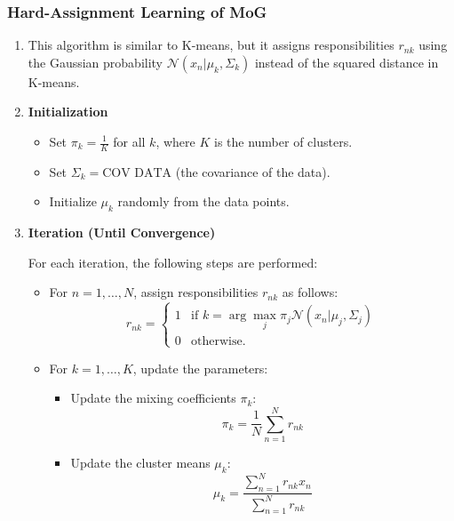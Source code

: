 \subsubsection{Hard-Assignment Learning of MoG}
\begin{definition}
    \begin{enumerate}
        \item This algorithm is similar to K-means, but it assigns responsibilities \( r_{nk} \) using the Gaussian probability \( \mathcal{N}(x_n | \mu_k, \Sigma_k) \) instead of the squared distance in K-means.

        \item \textbf{Initialization}
        \begin{itemize}
            \item Set \( \pi_k = \frac{1}{K} \) for all \( k \), where \( K \) is the number of clusters.
            \item Set \( \Sigma_k = \text{COV DATA} \) (the covariance of the data).
            \item Initialize \( \mu_k \) randomly from the data points.
        \end{itemize}
        
        \item \textbf{Iteration (Until Convergence)}
        
        For each iteration, the following steps are performed:
        
        \begin{itemize}
            \item For \( n = 1, \dots, N \), assign responsibilities \( r_{nk} \) as follows:
            \[
            r_{nk} = 
            \begin{cases} 
            1 & \text{if } k = \arg\max_j \pi_j \mathcal{N}(x_n | \mu_j, \Sigma_j) \\
            0 & \text{otherwise.}
            \end{cases}
            \]
            
            \item For \( k = 1, \dots, K \), update the parameters:
            \begin{itemize}
                \item Update the mixing coefficients \( \pi_k \):
                \[
                \pi_k = \frac{1}{N} \sum_{n=1}^{N} r_{nk}
                \]
                
                \item Update the cluster means \( \mu_k \):
                \[
                \mu_k = \frac{\sum_{n=1}^{N} r_{nk} x_n}{\sum_{n=1}^{N} r_{nk}}
                \]
                

\end{itemize}
\end{itemize}
\end{enumerate}
\end{definition}
